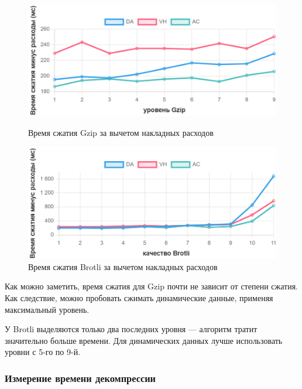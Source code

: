 \documentclass[12pt]{article}
\begin{document}
\begin{figure}[H]
    \centering
    \begin{minipage}{0.48\textwidth}
        \centering
        \includegraphics[width=\linewidth]{../images/Gzip compression time (min-overhead).png}
        \caption{Время сжатия Gzip за вычетом накладных расходов}
        \label{fig:image1}
    \end{minipage}
    \hfill
    \begin{minipage}{0.48\textwidth}
        \centering
        \includegraphics[width=\linewidth]{../images/Brotli compression time (min-overhead).png}
        \caption{Время сжатия Brotli за вычетом накладных расходов}
        \label{fig:image2}
    \end{minipage}
\end{figure}

Как можно заметить, время сжатия для Gzip почти не зависит от степени сжатия. Как следствие, можно пробовать сжимать динамические данные, применяя максимальный уровень.

У Brotli выделяются только два последних уровня — алгоритм тратит значительно больше времени. Для динамических данных лучше использовать уровни с 5-го по 9-й.

\subsubsection{Измерение времени декомпрессии}
\end{document}
